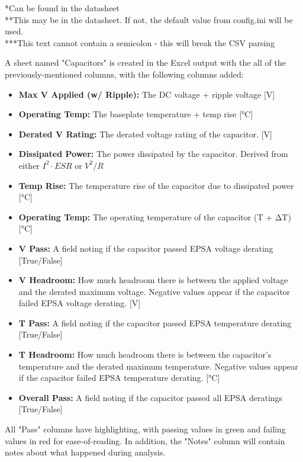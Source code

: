 \documentclass[12pt]{article}
\begin{document}
{\footnotesize
*Can be found in the datasheet\\
**This may be in the datasheet. If not, the default value from config.ini will be used.\\
***This text cannot contain a semicolon - this will break the CSV parsing
}

A sheet named "Capacitors" is created in the Excel output with the all of the previously-mentioned columns, with the following columns added:

\begin{itemize}
    \item \textbf{Max V Applied (w/ Ripple):} The DC voltage + ripple voltage [V] 
    \item \textbf{Operating Temp:} The baseplate temperature + temp rise [°C]
    \item \textbf{Derated V Rating:} The derated voltage rating of the capacitor. [V]
    \item \textbf{Dissipated Power:} The power dissipated by the capacitor. Derived from either \(I^2 ⋅ ESR\) or \(V^2/R\)
    \item \textbf{Temp Rise:} The temperature rise of the capacitor due to dissipated power [°C]
    \item \textbf{Operating Temp:} The operating temperature of the capacitor (T + ΔT) [°C]
    \item \textbf{V Pass:} A field noting if the capacitor passed EPSA voltage derating [True/False]
    \item \textbf{V Headroom:} How much headroom there is between the applied voltage and the derated maximum voltage. Negative values appear if the capacitor failed EPSA voltage derating. [V]
    \item \textbf{T Pass:} A field noting if the capacitor passed EPSA temperature derating [True/False]
    \item \textbf{T Headroom:} How much headroom there is between the capacitor's temperature and the derated maximum temperature. Negative values appear if the capacitor failed EPSA temperature derating. [°C]
    \item \textbf{Overall Pass:} A field noting if the capacitor passed all EPSA deratings [True/False]
\end{itemize}

All "Pass" columns have highlighting, with passing values in green and failing values in red for ease-of-reading. In addition, the "Notes" column will contain notes about what happened during analysis.
\end{document}
